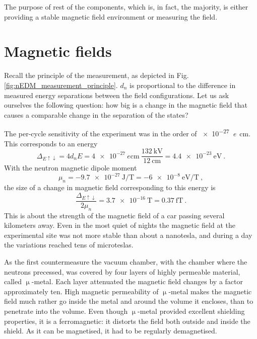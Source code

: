 The purpose of rest of the components, which is, in fact, the majority, is either providing a stable magnetic field environment or measuring the field.


\section{Magnetic fields}
Recall the principle of the measurement, as depicted in Fig.\,\ref{fig:nEDM_measurement_principle}. $d_n$ is proportional to the difference in measured energy separations between the field configurations. Let us ask ourselves the following question: how big is a change in the magnetic field that causes a comparable change in the separation of the states?

The per-cycle sensitivity of the experiment was in the order of \SI{e-27}{\elementarycharge\centi\meter}. This corresponds to an energy
\begin{equation}
  \Delta_{E\uparrow\downarrow} = 4 d_n E = \SI{4e-27}{\elementarycharge\centi\meter} \ \frac{ \SI{132}{\kilo\volt} }{ \SI{12}{\centi\meter} } = \SI{4.4e-23}{\electronvolt} \ .
\end{equation}
With the neutron magnetic dipole moment
\begin{equation}
  \mu_n = \SI{-9.7e-27}{\joule\per\tesla} = \SI{-6e-8}{\electronvolt\per\tesla} \ ,
\end{equation}
the size of a change in magnetic field corresponding to this energy is
\begin{equation}
  \frac{ \Delta_{E\uparrow\downarrow} }{2 \mu_n} = \SI{3.7e-16}{\tesla} = \SI{0.37}{\femto\tesla} \ .
\end{equation}
This is about the strength of the magnetic field of a car passing several kilometers away. Even in the most quiet of nights the magnetic field at the experimental site was not more stable than about a nanotesla, and during a day the variations reached tens of microteslas.

As the first countermeasure the vacuum chamber, with the chamber where the neutrons precessed, was covered by four layers of highly permeable material, called $\upmu$-metal. Each layer attenuated the magnetic field changes by a factor approximately ten. High magnetic permeability of $\upmu$-metal makes the magnetic field much rather go inside the metal and around the volume it encloses, than to penetrate into the volume. Even though $\upmu$-metal provided excellent shielding properties, it is a ferromagnetic: it distorts the field both outside and inside the shield. As it can be magnetised, it had to be regularly demagnetised.

